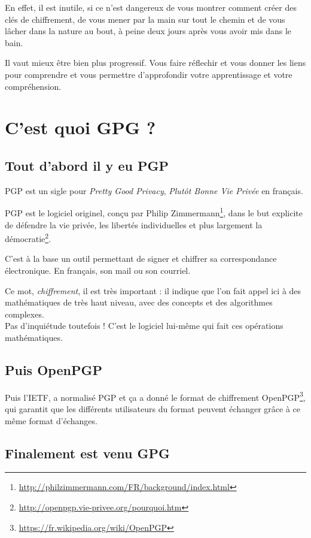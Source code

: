 En effet, il est inutile, si ce n'est dangereux de vous montrer comment
créer des clés de chiffrement, de vous mener par la main sur tout le
chemin et de vous lâcher dans la nature au bout, à peine deux jours
après vous avoir mis dans le bain.

Il vaut mieux être bien plus progressif. Vous faire réflechir et vous
donner les liens pour comprendre et vous permettre d'approfondir votre
apprentissage et votre compréhension.

\section{C'est quoi GPG ?}\label{cest-quoi-gpg}

\subsection{Tout d'abord il y eu PGP}\label{tout-dabord-il-y-eu-pgp}

PGP est un sigle pour \emph{Pretty Good Privacy}, \emph{Plutôt Bonne Vie Privée} en français.

PGP est le logiciel originel, conçu par Philip Zimmermann\footnote{\url{http://philzimmermann.com/FR/background/index.html}}, dans le
but explicite de défendre la vie privée, les libertés individuelles et plus largement la démocratie\footnote{\url{http://openpgp.vie-privee.org/pourquoi.htm}}.

C'est à la base un outil permettant de signer et chiffrer sa correspondance électronique. En français, son mail ou son courriel.

Ce mot, \emph{chiffrement}, il est très important : il indique que l'on
fait appel ici à des mathématiques de très haut niveau, avec des
concepts et des algorithmes complexes.\\Pas d'inquiétude toutefois !
C'est le logiciel lui-même qui fait ces opérations mathématiques.

\subsection{Puis OpenPGP}\label{puis-openpgp}

Puis l'IETF, a normalisé PGP et ça a donné le format de chiffrement OpenPGP\footnote{\url{https://fr.wikipedia.org/wiki/OpenPGP}}, qui garantit que
les différents utilisateurs du format peuvent échanger grâce à ce même format d'échanges.

\subsection{Finalement est venu GPG}\label{finalement-est-venu-gpg}

